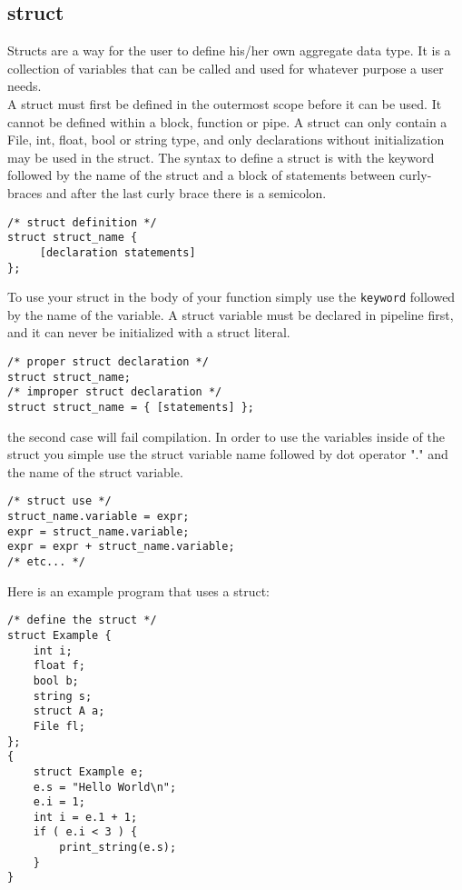 \documentclass[./Report_main.tex]{subfiles}
\begin{document}
\subsection{struct}
Structs are a way for the user to define his/her own aggregate data type. It is a collection of variables that can be called and used for whatever purpose a user needs. \\
A struct must first be defined in the outermost scope before it can be used. It cannot be defined within a block, function or pipe. A struct can only contain a File, int, float, bool or string type, and only declarations without initialization may be used in the struct. The syntax to define a struct is with the  keyword followed by the name of the struct and a block of statements between curly-braces and after the last curly brace there is a semicolon.
\begin{lstlisting}
/* struct definition */
struct struct_name {
     [declaration statements]
};
\end{lstlisting}
To use your struct in the body of your function simply use the \texttt{keyword} followed by the name of the variable. A struct variable must be declared in pipeline first, and it can never be initialized with a struct literal.
\begin{lstlisting}
/* proper struct declaration */
struct struct_name;
/* improper struct declaration */
struct struct_name = { [statements] };
\end{lstlisting}
the second case will fail compilation. In order to use the variables inside of the struct you simple use the struct variable name followed by dot operator "." and the name of the struct variable.
\begin{lstlisting}
/* struct use */
struct_name.variable = expr;
expr = struct_name.variable;
expr = expr + struct_name.variable; 
/* etc... */
\end{lstlisting}
Here is an example program that uses a struct:
\begin{lstlisting}
/* define the struct */
struct Example {
    int i;
    float f;
    bool b;
    string s;
    struct A a;
    File fl;
};
{
	struct Example e;
	e.s = "Hello World\n";
	e.i = 1;
	int i = e.1 + 1;
	if ( e.i < 3 ) {
	    print_string(e.s);
	}
}
\end{lstlisting}
\end{document}
